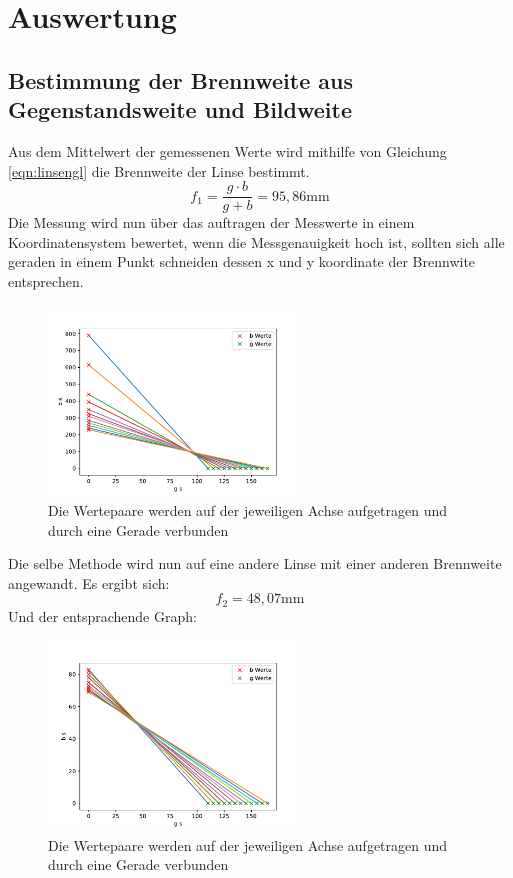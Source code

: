 \section{Auswertung}
\label{sec:Auswertung}
\subsection{Bestimmung der Brennweite aus Gegenstandsweite und Bildweite}
Aus dem Mittelwert der gemessenen Werte wird mithilfe von Gleichung \ref{eqn:linsengl} die Brennweite der Linse bestimmt.
\begin{equation}
    f_1 = \frac{g \cdot b}{g+b} = 95,86 \text{mm} \nonumber
\end{equation}
Die Messung wird nun über das auftragen der Messwerte in einem Koordinatensystem bewertet, wenn die Messgenauigkeit hoch ist, sollten sich alle geraden in einem Punkt schneiden dessen x und y koordinate der Brennwite entsprechen.
\begin{figure}[H]
    \centering
    \includegraphics[width=0.6\textwidth]{plots/plot1.pdf}
    \caption{Die Wertepaare werden auf der jeweiligen Achse aufgetragen und durch eine Gerade verbunden}
\end{figure}
Die selbe Methode wird nun auf eine andere Linse mit einer anderen Brennweite angewandt.
Es ergibt sich:
\begin{equation}
    f_2 = 48,07 \text{mm} \nonumber
\end{equation}
Und der entsprachende Graph:
\begin{figure}[H]
    \centering
    \includegraphics[width=0.6\textwidth]{plots/plot2.pdf}
    \caption{Die Wertepaare werden auf der jeweiligen Achse aufgetragen und durch eine Gerade verbunden}
\end{figure}

